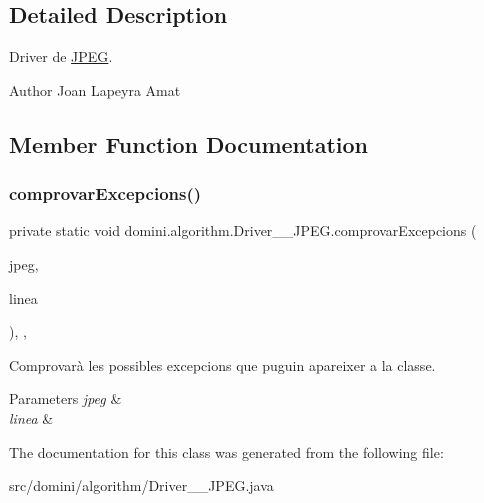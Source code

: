 \subsection{Detailed Description}
Driver de \hyperlink{classdomini_1_1algorithm_1_1JPEG}{J\+P\+EG}. 

\begin{DoxyAuthor}{Author}
Joan Lapeyra Amat 
\end{DoxyAuthor}


\subsection{Member Function Documentation}
\mbox{\label{classdomini_1_1algorithm_1_1Driver____JPEG_ae75883665dbbf55adaa8db46f2211c75}} 
\subsubsection{\texorpdfstring{comprovar\+Excepcions()}{comprovarExcepcions()}}
{\footnotesize\ttfamily private static void domini.\+algorithm.\+Driver\+\_\+\+\_\+\+J\+P\+E\+G.\+comprovar\+Excepcions (\begin{DoxyParamCaption}\item[{\hyperlink{classdomini_1_1algorithm_1_1JPEG}{J\+P\+EG}}]{jpeg,  }\item[{String}]{linea }\end{DoxyParamCaption})\hspace{0.3cm}{\ttfamily [inline]}, {\ttfamily [static]}, {\ttfamily [private]}}



Comprovarà les possibles excepcions que puguin apareixer a la classe. 


\begin{DoxyParams}{Parameters}
{\em jpeg} & \\
\hline
{\em linea} & \\
\hline
\end{DoxyParams}


The documentation for this class was generated from the following file\+:\begin{DoxyCompactItemize}
\item 
src/domini/algorithm/Driver\+\_\+\+\_\+\+J\+P\+E\+G.\+java\end{DoxyCompactItemize}
